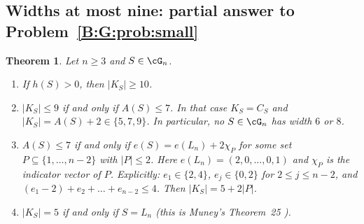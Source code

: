 \documentclass[11pt,a4paper]{article}
\newtheorem{theorem}{Theorem}[section]
\theoremstyle{definition}
\theoremstyle{remark}
\numberwithin{equation}{section}
\begin{document}
\subsection{Widths at most nine: partial answer to Problem~\ref{B:G:prob:small}}\label{B:G:sub:small}

\begin{theorem}\label{B:G:thm:small}
Let $n\ge3$ and $S\in\cG_n$.
\begin{enumerate}
\item[(a)] If $h(S)>0$, then $|K_S|\ge10$.
\item[(b)] $|K_S|\le9$ if and only if $A(S)\le7$. In that case $K_S=C_S$ and
$|K_S|=A(S)+2\in\{5,7,9\}$. In particular, no $S\in\cG_n$ has width $6$ or $8$.
\item[(c)] $A(S)\le7$ if and only if $e(S)=e(L_n)+2\chi_P$ for some set
$P\subseteq\{1,\dots,n-2\}$ with $|P|\le2$. Here $e(L_n)=(2,0,\dots,0,1)$ and $\chi_P$ is the
indicator vector of $P$. Explicitly: $e_1\in\{2,4\}$, $e_j\in\{0,2\}$ for $2\le j\le n-2$, and
$(e_1-2)+e_2+\dots+e_{n-2}\le4$. Then $|K_S|=5+2|P|$.
\item[(d)] $|K_S|=5$ if and only if $S=L_n$ (this is Muney's Theorem~25 \cite{R003}).
\end{enumerate}
\end{theorem}
\end{document}
